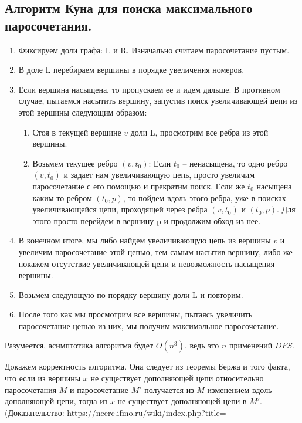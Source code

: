 \subsection{Алгоритм Куна для поиска максимального паросочетания.}
\begin{enumerate}
	\item Фиксируем доли графа: L и R. Изначально считаем паросочетание пустым. 
	\item В доле L перебираем вершины в порядке увеличения номеров.
	\item Если вершина насыщена, то пропускаем ее и идем дальше.
В противном случае, пытаемся насытить вершину, запустив поиск увеличивающей цепи из этой вершины следующим образом: 
	\begin{enumerate}
		\item Стоя в текущей вершине $v$ доли L, просмотрим все ребра из этой вершины.
		\item Возьмем текущее ребро $(v, t_0)$: 
Если $t_0$ -- ненасыщена, то одно ребро $(v, t_0)$ и задает нам увеличивающую цепь, просто увеличим паросочетание с его помощью и прекратим поиск.
Если же $t_0$ насыщена каким-то ребром  $(t_0, p)$, то пойдем вдоль этого ребра, уже в поисках увеличивающейся цепи, проходящей через ребра $(v, t_0)$ и  $(t_0, p)$. Для этого просто перейдем в вершину p и продолжим обход из нее.
	\end{enumerate}
\item В конечном итоге, мы либо найдем увеличивающую цепь из вершины $v$ и увеличим паросочетание этой цепью, тем самым насытив вершину, либо же покажем отсутствие увеличивающей цепи и невозможность насыщения вершины.
\item Возьмем следующую по порядку вершину доли L и повторим.
\item После того как мы просмотрим все вершины, пытаясь увеличить паросочетание цепью из них, мы получим максимальное паросочетание.
\end{enumerate}
Разумеется, асимптотика алгоритма будет $O(n^3)$, ведь это $n$ применений $DFS$. 
\par
Докажем корректность алгоритма. Она следует из теоремы Бержа и того факта, что если из вершины $x$ не существует дополняющей цепи относительно паросочетания $M$ и паросочетание $M′$ получается из $M$ изменением вдоль дополняющей цепи, тогда из $x$ не существует дополняющей цепи в $M′$. (Доказательство: https://neerc.ifmo.ru/wiki/index.php?title=%


